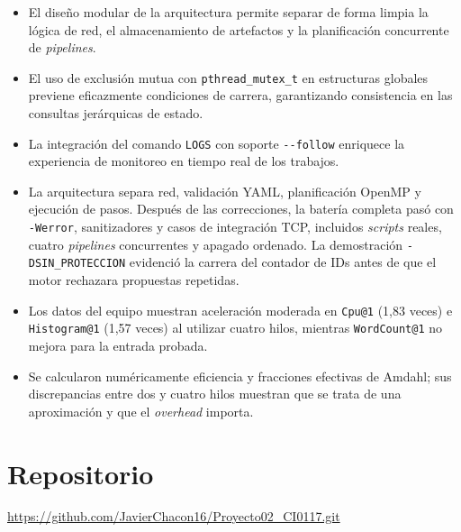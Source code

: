 \documentclass[12pt,a4paper]{article}
\newcommand{\code}[1]{\texttt{#1}}
\begin{document}
\begin{itemize}
  \item El diseño modular de la arquitectura permite separar de forma limpia la lógica de red, el almacenamiento de artefactos y la planificación concurrente de \textit{pipelines}.
  \item El uso de exclusión mutua con \code{pthread\_mutex\_t} en estructuras globales previene eficazmente condiciones de carrera, garantizando consistencia en las consultas jerárquicas de estado.
  \item La integración del comando \code{LOGS} con soporte \code{-{}-follow} enriquece la experiencia de monitoreo en tiempo real de los trabajos.
  \item La arquitectura separa red, validación YAML, planificación OpenMP y ejecución de pasos. Después de las correcciones, la batería completa pasó con \code{-Werror}, sanitizadores y casos de integración TCP, incluidos \textit{scripts} reales, cuatro \textit{pipelines} concurrentes y apagado ordenado. La demostración \code{-DSIN\_PROTECCION} evidenció la carrera del contador de IDs antes de que el motor rechazara propuestas repetidas.
  \item Los datos del equipo muestran aceleración moderada en \code{Cpu@1} (1,83 veces) e \code{Histogram@1} (1,57 veces) al utilizar cuatro hilos, mientras \code{WordCount@1} no mejora para la entrada probada.
  \item Se calcularon numéricamente eficiencia y fracciones efectivas de Amdahl; sus discrepancias entre dos y cuatro hilos muestran que se trata de una aproximación y que el \textit{overhead} importa.
\end{itemize}

\section{Repositorio}

\url{https://github.com/JavierChacon16/Proyecto02_CI0117.git}
\end{document}

